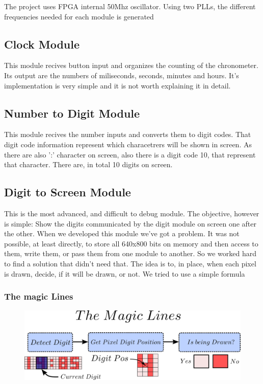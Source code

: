 The project uses FPGA internal 50Mhz oscillator. Using two PLLs, the different frequencies needed for each module is generated

\subsection*{Clock Module}

This module recives button input and organizes the counting of the chronometer.
Its output are the numbers of miliseconds, seconds, minutes and hours.
It's implementation is very simple and it is not worth explaining it in detail.

\subsection*{Number to Digit Module}

This module recives the number inputs and converts them to digit codes. That digit code information represent which characetrers will be shown in screen. As there are also ':' character on screen, also there is a digit code 10, that represent that character.
There are, in total 10 digits on screen.

\subsection*{Digit to Screen Module}
This is the most advanced, and difficult to debug module. The objective, however is simple: Show the digits communicated by the digit module on screen one after the other.
When we developed this module we've got a problem. It was not possible, at least directly, to store all 640x800 bits on memory and then access to them, write them, or pass them from one module to another. So we worked hard to find a solution that didn't need that.
The idea is to, in place, when each pixel is drawn, decide, if it will be drawn, or not. We tried to use a simple formula 

\subsubsection*{The magic Lines}
\begin{figure}[htbp]
    \begin{center}
    \includegraphics[scale=0.8]{dibujos/digitpng.png}
    
    \end{center}
    
    \label{fig:Pll}
    \end{figure}

